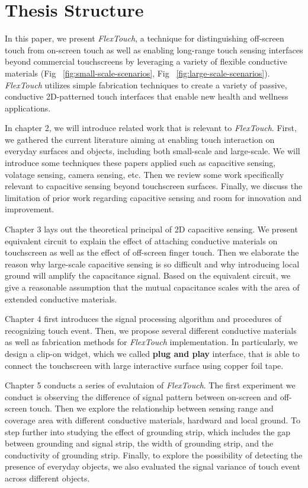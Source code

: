 \section{Thesis Structure}
In this paper, we present \textit{FlexTouch}, a technique for distinguishing off-screen touch from on-screen touch as well as enabling long-range touch sensing interfaces beyond commercial touchscreens by leveraging a variety of flexible conductive materials (Fig ~\ref{fig:small-scale-scenarios}, Fig ~\ref{fig:large-scale-scenarios}). \textit{FlexTouch} utilizes simple fabrication techniques to create a variety of passive, conductive 2D-patterned touch interfaces that enable new health and wellness applications.

In chapter 2, we will introduce related work that is relevant to \textit{FlexTouch}. First, we gathered the current literature aiming at enabling touch interaction on everyday surfaces and objects, including both small-scale and large-scale. We will introduce some techniques these papers applied such as capacitive sensing, volatage sensing, camera sensing, etc. Then we review some work specifically relevant to capacitive sensing beyond touchscreen surfaces. Finally, we discuss the limitation of prior work regarding capacitive sensing and room for innovation and improvement.

Chapter 3 lays out the theoretical principal of 2D capacitive sensing. We present equivalent circuit to explain the effect of attaching conductive materials on touchscreen as well as the effect of off-screen finger touch. Then we elaborate the reason why large-scale capacitive sensing is so difficult and why introducing local ground will amplify the capacitance signal. Based on the equivalent circuit, we give a reasonable assumption that the mutual capacitance scales with the area of extended conductive materials.

Chapter 4 first introduces the signal processing algorithm and procedures of recognizing touch event. Then, we propose several different conductive materials as well as fabrication methods for \textit{FlexTouch} implementation. In particularly, we design a clip-on widget, which we called \textbf{plug and play} interface,  that is able to connect the touchscreen with large interactive surface using copper foil tape.

Chapter 5 conducts a series of evalutaion of \textit{FlexTouch}. The first experiment we conduct is observing the difference of signal pattern between on-screen and off-screen touch. Then we explore the relationship between sensing range and coverage area with different conductive materials, hardward and local ground. To step further into studying the effect of grounding strip, which includes the gap between grounding and signal strip, the width of grounding strip, and the conductivity of grounding strip. Finally, to explore the possibility of detecting the presence of everyday objects, we also evaluated the signal variance of touch event across different objects.


